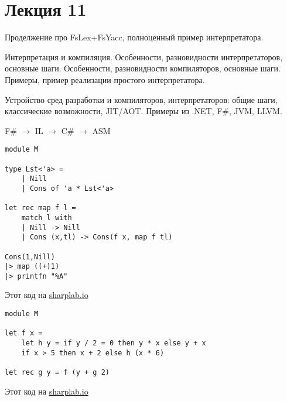 \section{Лекция 11}

Проделжение про FsLex+FsYacc, полноценный пример интерпретатора. 
 

Интерпретация и компиляция. Особенности, разновидности интерпретаторов, основные шаги.  Особенности, разновидности компиляторов, основные шаги. Примеры, пример реализации простого интерпретатора.

Устройство сред разработки и компиляторов, интерпретаторов: общие шаги, классические возможности, JIT/AOT. Примеры из .NET, F\#, JVM, LLVM.

F\# $\to$ IL $\to$ C\# $\to$ ASM

\begin{verbatim}
module M

type Lst<'a> =
    | Nill
    | Cons of 'a * Lst<'a>
    
let rec map f l =
    match l with
    | Nill -> Nill
    | Cons (x,tl) -> Cons(f x, map f tl)

Cons(1,Nill)
|> map ((+)1) 
|> printfn "%A"

\end{verbatim}
Этот код на \href{https://sharplab.io/#v2:DYLgZgzgNALiCWwoBMQGoA+BbA9sgrsAKYAEAsgLABQ1MAngA6kAyEMAPAOQCGAfCQF5qJESQwkAcomDDR4gMI4AdhBI4wJHiQBUJVhx69ZI6sRgkATkQDGJLNwYkNwQcbvcY1gBYkXAd3gYLzdxKWAXAFp+MJkqUTESRRUSAAoAD1hgAEoSKMTlCBSNDPdHDRhs6mokwoBGKBis6gx+e0cUlLQs2pzm/gYLeCUYMCUSACIAUgBBcbdqIA==}{sharplab.io}


\begin{verbatim}
module M

let f x = 
    let h y = if y / 2 = 0 then y * x else y + x
    if x > 5 then x + 2 else h (x * 6)
    
let rec g y = f (y + g 2)

\end{verbatim}
Этот код на \href{https://sharplab.io/#v2:DYLgZgzgNAJiDUAfAtgexgV2AUwAQFkBYAKBJwBdcxcAPXAXlxNxdwtwAtcBPB3AS2q8A9LgBMfAAy5yHbADseuAFS1c2YBDy94tZq0FqAfLgCsMuYrq6JGrZ1wAKOqoBsASn0sy2SgCdsAGNcAHMlRmpHHVDxT2IgA=}{sharplab.io}